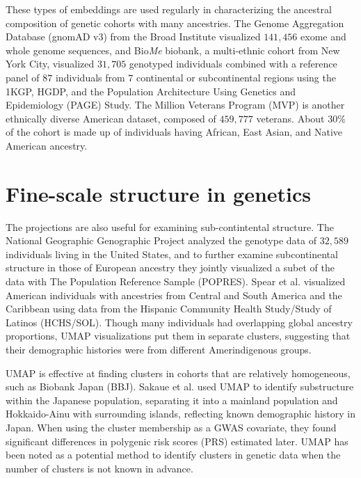 \documentclass[12pt]{article}
\begin{document}
These types of embeddings are used regularly in characterizing the ancestral composition of genetic cohorts with many ancestries. The Genome Aggregation Database (gnomAD v3) from the Broad Institute visualized $141,456$ exome and whole genome sequences\cite{karczewski_mutational_2020}, and Bio\textit{Me} biobank, a multi-ethnic cohort from New York City, visualized $31,705$ genotyped individuals combined with a reference panel of $87$ individuals from $7$ continental or subcontinental regions using the 1KGP, HGDP, and the Population Architecture Using Genetics and Epidemiology (PAGE) Study\cite{matise2011next}. The Million Veterans Program (MVP) is another ethnically diverse American dataset, composed of $459,777$ veterans. About $30\%$ of the cohort is made up of individuals having African, East Asian, and Native American ancestry\cite{hunter-zinck_genotyping_2020}.

\section*{Fine-scale structure in genetics}
The projections are also useful for examining sub-contintental structure. The National Geographic Genographic Project analyzed the genotype data of $32,589$ individuals living in the United States\cite{dai_population_2020}, and to further examine subcontinental structure in those of European ancestry they jointly visualized a subet of the data with The Population Reference Sample (POPRES)\cite{nelson2008population}. Spear et al. visualized American individuals with ancestries from Central and South America and the Caribbean using data from the Hispanic Community Health Study/Study of Latinos (HCHS/SOL)\cite{sorlie2010design}. Though many individuals had overlapping global ancestry proportions, UMAP visualizations put them in separate clusters, suggesting that their demographic histories were from different Amerindigenous groups\cite{spear2020recent}.

UMAP is effective at finding clusters in cohorts that are relatively homogeneous, such as Biobank Japan (BBJ)\cite{nagai2017overview}. Sakaue et al.\cite{sakaue_dimensionality_2020} used UMAP to identify substructure within the Japanese population, separating it into a mainland population and Hokkaido-Ainu with surrounding islands, reflecting known demographic history in Japan. When using the cluster membership as a GWAS covariate, they found significant differences in polygenic risk scores (PRS) estimated later. UMAP has been noted as a potential method to identify clusters in  genetic data when the number of clusters is not known in advance\cite{tonkin-hill_fast_2019}.
\end{document}
